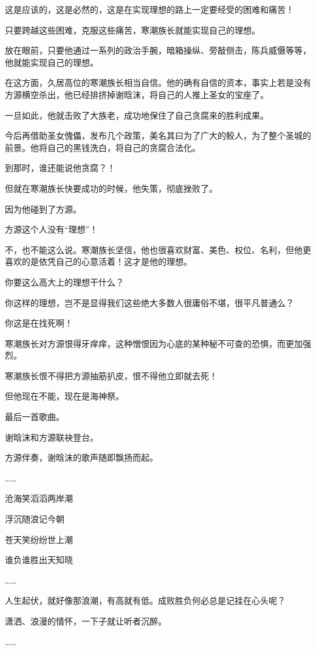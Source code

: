 \begin{this_body}
这是应该的，这是必然的，这是在实现理想的路上一定要经受的困难和痛苦！

只要跨越这些困难，克服这些痛苦，寒潮族长就能实现自己的理想。

放在眼前，只要他通过一系列的政治手腕，暗箱操纵、旁敲侧击，陈兵威慑等等，他就能实现自己的理想。

在这方面，久居高位的寒潮族长相当自信。他的确有自信的资本，事实上若是没有方源横空杀出，他已经排挤掉谢晗沫，将自己的人推上圣女的宝座了。

一旦如此，他就击败了大族老，成功地保住了自己贪腐来的胜利成果。

今后再借助圣女傀儡，发布几个政策，美名其曰为了广大的鲛人，为了整个圣城的前景。他将自己的黑钱洗白，将自己的贪腐合法化。

到那时，谁还能说他贪腐？！

但就在寒潮族长快要成功的时候，他失策，彻底挫败了。

因为他碰到了方源。

方源这个人没有“理想”！

不，也不能这么说。寒潮族长坚信，他也很喜欢财富、美色、权位、名利，但他更喜欢的是依凭自己的心意活着！这才是他的理想。

你要这么高大上的理想干什么？

你这样的理想，岂不是显得我们这些绝大多数人很庸俗不堪，很平凡普通么？

你这是在找死啊！

寒潮族长对方源恨得牙痒痒，这种憎恨因为心底的某种秘不可查的恐惧，而更加强烈。

寒潮族长恨不得把方源抽筋扒皮，恨不得他立即就去死！

但他现在不能，现在是海神祭。

最后一首歌曲。

谢晗沫和方源联袂登台。

方源伴奏，谢晗沫的歌声随即飘扬而起。

……

沧海笑滔滔两岸潮

浮沉随浪记今朝

苍天笑纷纷世上潮

谁负谁胜出天知晓

……

人生起伏，就好像那浪潮，有高就有低。成败胜负何必总是记挂在心头呢？

潇洒、浪漫的情怀，一下子就让听者沉醉。

……


\end{this_body}

